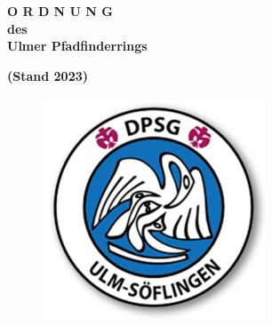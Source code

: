\begin{titlepage}
    \vspace*{\fill}
    \begin{center}
        \begin{Huge}
            \textbf{
                O R D N U N G \\
                \vspace{20pt}
                des\\ 
                \vspace{20pt}
                Ulmer Pfadfinderrings\\
                \vspace{20pt}
            }
        \end{Huge}
        \begin{Large}
            \textbf{
                (Stand 2023)
            }
        \end{Large}
        \vspace{200pt}
        \begin{figure}[h!]
            \centering
            \begin{minipage}{.2\linewidth}
                \centering
                \includegraphics[width=\textwidth]{../img/dpsg_ulm-soeflingen.png}
            \end{minipage}%
            \begin{minipage}{.2\linewidth}

\end{minipage}
\end{figure}
\end{center}
\end{titlepage}
